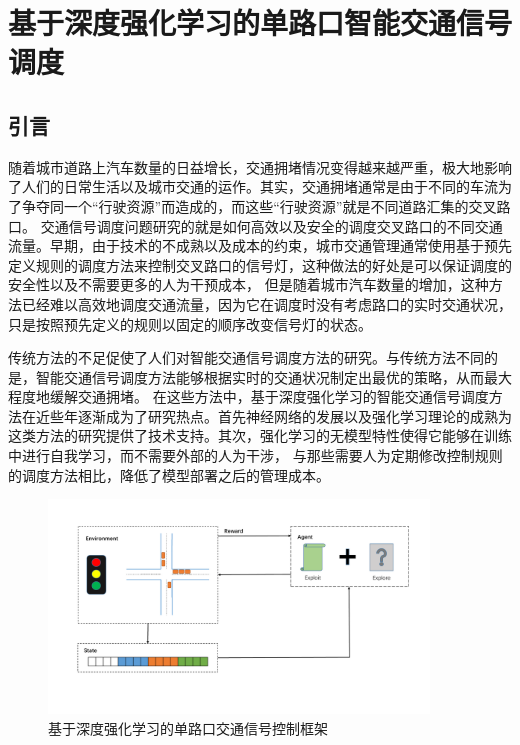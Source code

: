 
\chapter{基于深度强化学习的单路口智能交通信号调度}
\section{引言}
随着城市道路上汽车数量的日益增长，交通拥堵情况变得越来越严重，极大地影响了人们的日常生活以及城市交通的运作。其实，交通拥堵通常是由于不同的车流为了争夺同一个“行驶资源”而造成的，而这些“行驶资源”就是不同道路汇集的交叉路口。
交通信号调度问题研究的就是如何高效以及安全的调度交叉路口的不同交通流量。早期，由于技术的不成熟以及成本的约束，城市交通管理通常使用基于预先定义规则的调度方法来控制交叉路口的信号灯，这种做法的好处是可以保证调度的安全性以及不需要更多的人为干预成本，
但是随着城市汽车数量的增加，这种方法已经难以高效地调度交通流量，因为它在调度时没有考虑路口的实时交通状况，只是按照预先定义的规则以固定的顺序改变信号灯的状态。

传统方法的不足促使了人们对智能交通信号调度方法的研究。与传统方法不同的是，智能交通信号调度方法能够根据实时的交通状况制定出最优的策略，从而最大程度地缓解交通拥堵。
在这些方法中，基于深度强化学习的智能交通信号调度方法在近些年逐渐成为了研究热点。首先神经网络的发展以及强化学习理论的成熟为这类方法的研究提供了技术支持。其次，强化学习的无模型特性使得它能够在训练中进行自我学习，而不需要外部的人为干涉，
与那些需要人为定期修改控制规则的调度方法相比，降低了模型部署之后的管理成本。

\begin{figure}[htb]
    \includegraphics[width=0.9\textwidth]{fig/single-intersection-RL.pdf}
    \caption{基于深度强化学习的单路口交通信号控制框架}
    \label{fig:single-tsc-rl}
\end{figure}

